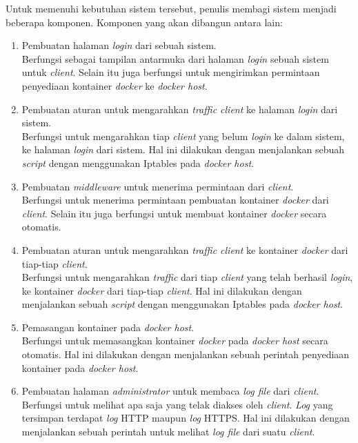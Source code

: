 \indent Untuk memenuhi kebutuhan sistem tersebut, penulis membagi sistem menjadi beberapa komponen. Komponen yang akan dibangun antara lain: 
\begin{enumerate} 
	\item Pembuatan halaman \textit{login} dari sebuah sistem.\\
	Berfungsi sebagai tampilan antarmuka dari halaman \textit{login} sebuah sistem untuk \textit{client}. Selain itu juga berfungsi untuk mengirimkan permintaan penyediaan kontainer \textit{docker} ke \textit{docker host}.
	\item Pembuatan aturan untuk mengarahkan \textit{traffic client} ke halaman \textit{login} dari sistem.\\
	Berfungsi untuk mengarahkan tiap \textit{client} yang belum \textit{login} ke dalam sistem, ke halaman \textit{login} dari sistem. Hal ini dilakukan dengan menjalankan sebuah \textit{script} dengan menggunakan Iptables pada \textit{docker host}.
	\item Pembuatan \textit{middleware} untuk menerima permintaan dari \textit{client}.\\
	Berfungsi untuk menerima permintaan pembuatan kontainer \textit{docker} dari \textit{client}. Selain itu juga berfungsi untuk membuat kontainer \textit{docker} secara otomatis.
	\item Pembuatan aturan untuk mengarahkan \textit{traffic client} ke kontainer \textit{docker} dari tiap-tiap \textit{client}.\\
	Berfungsi untuk mengarahkan \textit{traffic} dari tiap \textit{client} yang telah berhasil \textit{login}, ke kontainer \textit{docker} dari tiap-tiap \textit{client}. Hal ini dilakukan dengan menjalankan sebuah \textit{script} dengan menggunakan Iptables pada \textit{docker host}.
	\item Pemasangan kontainer pada \textit{docker host}.\\
	Berfungsi untuk memasangkan kontainer \textit{docker} pada \textit{docker host} secara otomatis. Hal ini dilakukan dengan menjalankan sebuah perintah penyediaan kontainer pada \textit{docker host}.
	\item Pembuatan halaman \textit{administrator} untuk membaca \textit{log file} dari \textit{client}.\\
	Berfungsi untuk melihat apa saja yang telak diakses oleh \textit{client}. \textit{Log} yang tersimpan terdapat \textit{log} HTTP maupun \textit{log} HTTPS.  Hal ini dilakukan dengan menjalankan sebuah perintah untuk melihat \textit{log file} dari suatu \textit{client}.
	
\end{enumerate}

